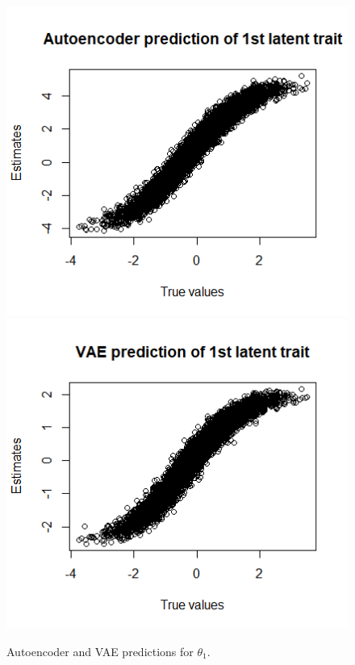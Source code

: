 \begin{figure}[h!]
   \includegraphics[width=\textwidth]{img/aied_results/ae_theta1_corr.png}
   \endminipage\hfill
   \includegraphics[width=\textwidth]{img/aied_results/vae_theta1_corr.png}
   \endminipage\hfill
   \caption{Autoencoder and VAE predictions for $\theta_1$.}
   \label{fig:vae_vs_ae_theta}
\end{figure}

